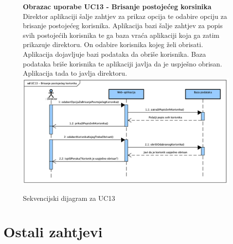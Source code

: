 				\begin{figure}[H]
					\textbf{Obrazac uporabe UC13 - Brisanje postojećeg korsinika}
					Direktor aplikaciji šalje zahtjev za prikaz opcija te odabire opciju za brisanje postojećeg korisnika. Aplikacija bazi šalje zahtjev za popis svih postojećih korisnika te ga baza vraća aplikaciji koja ga zatim prikazuje direktoru.
					On odabire korisnika kojeg želi obrisati. Aplikacija dojavljuje bazi podataka da obriše korisnika. Baza podataka briše korisnika te aplikaciji javlja da je uspješno obrisan. Aplikacija tada to javlja direktoru.
					\newline
					\includegraphics[width=\textwidth]{slike/Sequence_UC13.png}
					\caption{Sekvencijski dijagram za UC13}
					\label{fig:sequence_UC13}
				\end{figure}

	
		\section{Ostali zahtjevi}
		 
